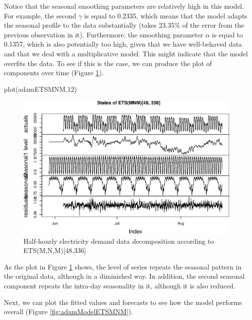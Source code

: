 \documentclass[
]{book}
\newenvironment{Shaded}{\begin{snugshade}}{\end{snugshade}}
\newcommand{\DecValTok}[1]{\textcolor[rgb]{0.00,0.00,0.81}{#1}}
\newcommand{\FunctionTok}[1]{\textcolor[rgb]{0.00,0.00,0.00}{#1}}
\newcommand{\NormalTok}[1]{#1}
\theoremstyle{definition}
\theoremstyle{definition}
\theoremstyle{definition}
\theoremstyle{definition}
\theoremstyle{remark}
\begin{document}
Notice that the seasonal smoothing parameters are relatively high in this model. For example, the second \(\gamma\) is equal to 0.2335, which means that the model adapts the seasonal profile to the data substantially (takes 23.35\% of the error from the previous observation in it). Furthermore, the smoothing parameter \(\alpha\) is equal to 0.1357, which is also potentially too high, given that we have well-behaved data and that we deal with a multiplicative model. This might indicate that the model overfits the data. To see if this is the case, we can produce the plot of components over time (Figure \ref{fig:adamModelETSMNM12}).

\begin{Shaded}
\begin{Highlighting}[]
\FunctionTok{plot}\NormalTok{(adamETSMNM,}\DecValTok{12}\NormalTok{)}
\end{Highlighting}
\end{Shaded}

\begin{figure}
\centering
\includegraphics{Svetunkov--2022----ADAM_files/figure-latex/adamModelETSMNM12-1.pdf}
\caption{\label{fig:adamModelETSMNM12}Half-hourly electricity demand data decomposition according to ETS(M,N,M){[}48,336{]}}
\end{figure}

As the plot in Figure \ref{fig:adamModelETSMNM12} shows, the level of series repeats the seasonal pattern in the original data, although in a diminished way. In addition, the second seasonal component repeats the intra-day seasonality in it, although it is also reduced.

Next, we can plot the fitted values and forecasts to see how the model performs overall (Figure \ref{fig:adamModelETSMNM}).
\end{document}
